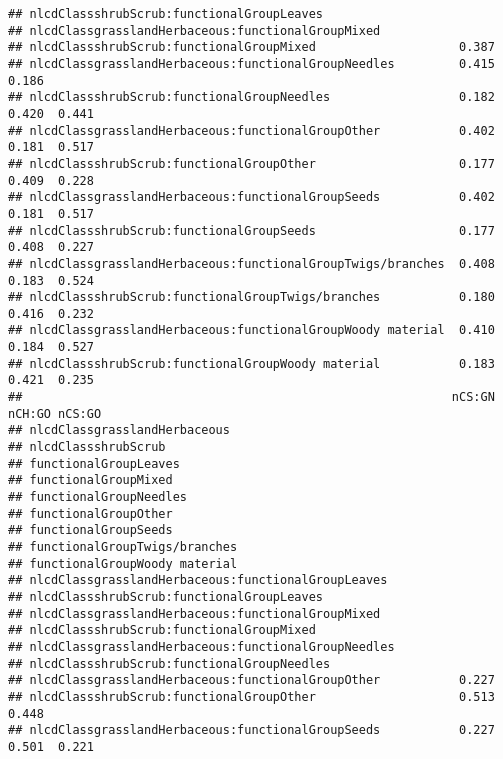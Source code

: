 \documentclass[]{article}
\begin{document}
\begin{verbatim}
## nlcdClassshrubScrub:functionalGroupLeaves                                      
## nlcdClassgrasslandHerbaceous:functionalGroupMixed                              
## nlcdClassshrubScrub:functionalGroupMixed                    0.387              
## nlcdClassgrasslandHerbaceous:functionalGroupNeedles         0.415  0.186       
## nlcdClassshrubScrub:functionalGroupNeedles                  0.182  0.420  0.441
## nlcdClassgrasslandHerbaceous:functionalGroupOther           0.402  0.181  0.517
## nlcdClassshrubScrub:functionalGroupOther                    0.177  0.409  0.228
## nlcdClassgrasslandHerbaceous:functionalGroupSeeds           0.402  0.181  0.517
## nlcdClassshrubScrub:functionalGroupSeeds                    0.177  0.408  0.227
## nlcdClassgrasslandHerbaceous:functionalGroupTwigs/branches  0.408  0.183  0.524
## nlcdClassshrubScrub:functionalGroupTwigs/branches           0.180  0.416  0.232
## nlcdClassgrasslandHerbaceous:functionalGroupWoody material  0.410  0.184  0.527
## nlcdClassshrubScrub:functionalGroupWoody material           0.183  0.421  0.235
##                                                            nCS:GN nCH:GO nCS:GO
## nlcdClassgrasslandHerbaceous                                                   
## nlcdClassshrubScrub                                                            
## functionalGroupLeaves                                                          
## functionalGroupMixed                                                           
## functionalGroupNeedles                                                         
## functionalGroupOther                                                           
## functionalGroupSeeds                                                           
## functionalGroupTwigs/branches                                                  
## functionalGroupWoody material                                                  
## nlcdClassgrasslandHerbaceous:functionalGroupLeaves                             
## nlcdClassshrubScrub:functionalGroupLeaves                                      
## nlcdClassgrasslandHerbaceous:functionalGroupMixed                              
## nlcdClassshrubScrub:functionalGroupMixed                                       
## nlcdClassgrasslandHerbaceous:functionalGroupNeedles                            
## nlcdClassshrubScrub:functionalGroupNeedles                                     
## nlcdClassgrasslandHerbaceous:functionalGroupOther           0.227              
## nlcdClassshrubScrub:functionalGroupOther                    0.513  0.448       
## nlcdClassgrasslandHerbaceous:functionalGroupSeeds           0.227  0.501  0.221

\end{verbatim}
\end{document}
